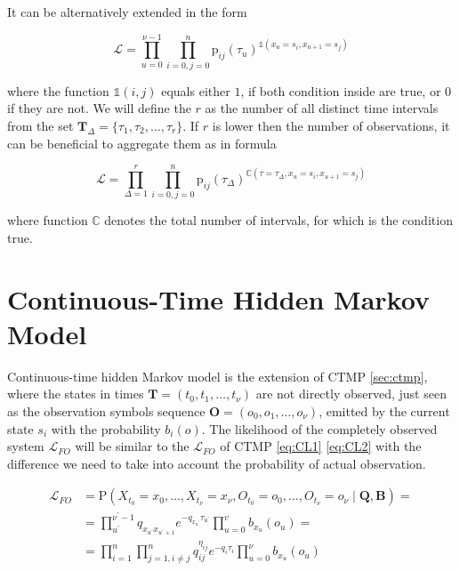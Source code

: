 \documentclass[thesis=M,english]{FITthesis}[2012/10/20]
\newcommand{\matr}[1]{\mathbf{#1}}
\begin{document}
It can be alternatively extended in the form

\begin{equation}
 \mathcal{L} = \prod_{u=0}^{\nu-1} \prod_{i=0,j=0}^{n}  \mathrm{p}_{ij}(\tau_u)^{\mathds{1}( x_u = s_i, x_{u+1} = s_j )} 
\end{equation}

where the function $\mathds{1}(i,j)$ equals either $1$, if both condition inside are true, or $0$ if they are not. 
We will define the $r$ as the number of all distinct time intervals from the set $ \matr{T}_{\Delta} = \{ \tau_1,\tau_2,\dots,\tau_r\}$. If $r$ is lower then the number of observations, it can be beneficial to aggregate them as in formula

\begin{equation}\label{eq:CTL}
 \mathcal{L} = \prod_{\Delta = 1}^{r} \prod_{i=0,j=0}^{n}  \mathrm{p}_{ij}(\tau_{\Delta})^{\mathbb{C}( \tau=\tau_{\Delta}, x_u = s_i, x_{u+1} = s_j )} 
\end{equation}

where function $\mathbb{C}$ denotes the total number of intervals, for which is the condition true.
    
\section{Continuous-Time Hidden Markov Model}\label{sec:cthmm1}



Continuous-time hidden Markov model is the extension of CTMP \ref{sec:ctmp}, where the states in times $\matr{T} = ( t_0, t_1, \dots, t_{\nu} )$ are not directly observed, just seen as the observation symbols sequence $\matr{O} = (  o_0, o_1, \dots, o_{\nu} )$, emitted by the current state $s_i$ with the probability $b_i(o)$.
The likelihood of the completely observed system  $\mathcal{L}_{FO}$ will be similar to the $\mathcal{L}_{FO}$ of CTMP \eqref{eq:CL1} \eqref{eq:CL2} with the difference we need to take into account the probability of actual observation.

\begin{equation}\label{eq:HMCL1}
\begin{aligned} 
			\mathcal{L}_{FO} &= \mathrm{P}(X_{t_0} = x_0, \dots ,X_{t_\nu} = x_\nu, O_{t_0} = o_0, \dots ,O_{t_\nu} = o_\nu \mid \matr{Q}, \matr{B} ) = \\
  &= \prod_{u^{'}}^{\nu^{'}-1} q_{x_{u^{'}} x_{u^{'}+1}} e^{ - q_{x_{u^{'}}} \tau_{u^{'}} } 
    \prod_{u=0}^v b_{ x_u }(o_u) = \\
    &= \prod_{i=1}^{n} \prod_{j=1, i \neq j}^{n} q_{ij}^{\eta_{ij} } e^{ - q_i \tau_i } \prod_{u=0}^\nu b_{x_u}(o_u)
\end{aligned}
\end{equation}
\end{document}
